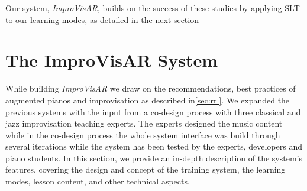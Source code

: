 \documentclass{vgtc}                          %
\begin{document}
Our system, \textit{ImproVisAR}, %
builds on the success of these studies by applying SLT to our learning modes, as detailed in the next section



\section{The ImproVisAR System}
\label{sec:system}

\par While building \textit{ImproVisAR} we draw on the recommendations, best practices of augmented pianos and improvisation as described in\autoref{sec:rrl}. We expanded the previous systems with the input from a co-design process with three classical and jazz improvisation teaching experts. The experts designed the music content while in the co-design process the whole system interface was build through several iterations while the system has been tested by the experts, developers and piano students. %
In this section, we provide an in-depth description of the system's features, covering the design and concept of the training system, the learning modes, lesson content, and other technical aspects.
\end{document}
